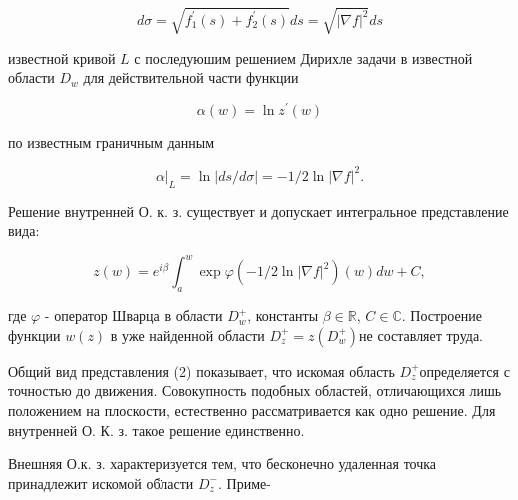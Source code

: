 \documentclass[10pt]{article}
\begin{document}
\[

d \sigma=\sqrt{f_{1}^{\prime}(s)+f_{2}^{\prime}(s)} d s=\sqrt{|\nabla f|^{2}} d s

\]



известной кривой $L$ с последуюшим решением Дирихле задачи в известной области $D_{w}$ для действительной части функции



\[

\alpha(w)=\ln z^{\prime}(w)

\]



по известным граничным данным



\[

\left.\alpha\right|_{L}=\ln |d s / d \sigma|=-1 / 2 \ln |\nabla f|^{2} .

\]



Решение внутренней О. к. з. существует и допускает интегральное представление вида:



\[

z(w)=e^{i \beta} \int_{a}^{w} \exp \varphi\left(-1 / 2 \ln |\nabla f|^{2}\right)(w) d w+C,

\]



где $\varphi$ - оператор Шварца в области $D_{w}^{+}$, константы $\beta \in \mathbb{R}$, $C \in \mathbb{C}$. Построение функции $w(z)$ в уже найденной области $D_{z}^{+}=z\left(D_{w}^{+}\right)$не составляет труда.



Общий вид представления (2) показывает, что искомая область $D_{z}^{+}$определяется с точностью до движения. Совокупность подобных областей, отличающихся лишь положением на плоскости, естественно рассматривается как одно решение. Для внутренней О. К. з. такое решение единственно.



Внешняя О.к. з. характеризуется тем, что бесконечно удаленная точка принадлежит искомой об̈ласти $D_{z}^{-}$. Приме-
\end{document}

